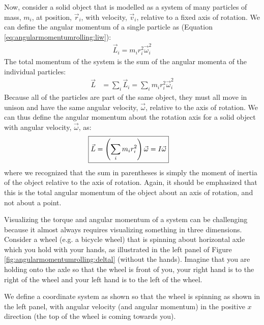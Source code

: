 Now, consider a solid object that is modelled as a system of many particles of mass, $m_i$, at position, $\vec r_i$, with velocity, $\vec v_i$, relative to a fixed axis of rotation. We can define the angular momentum of a single particle as (Equation \ref{eq:angularmomentumrolling:liw}):
\begin{align*}
\vec L_i = m_i r_i^2 \vec \omega_i^2
\end{align*}
The total momentum of the system is the sum of the angular momenta of the individual particles:
\begin{align*}
\vec L &= \sum_i\vec L_i = \sum_i  m_i r_i^2 \vec \omega_i^2
\end{align*}
Because all of the particles are part of the same object, they must all move in unison and have the same angular velocity, $\vec\omega$, relative to the axis of rotation. We can thus define the angular momentum about the rotation axis for a solid object with angular velocity, $\vec\omega$, as:
\begin{align}
\Aboxed{\vec L &= \left(\sum_i  m_i r_i^2\right) \vec \omega = I\vec\omega}
\end{align}
where we recognized that the sum in parentheses is simply the moment of inertia of the object relative to the axis of rotation. Again, it should be emphasized that this is the total angular momentum of the object about an axis of rotation, and not about a point. 

Visualizing the torque and angular momentum of a system can be challenging because it almost always requires visualizing something in three dimensions. Consider a wheel (e.g. a bicycle wheel) that is spinning about horizontal axle which you hold with your hands, as illustrated in the left panel of Figure \ref{fig:angularmomentumrolling:deltal} (without the hands). Imagine that you are holding onto the axle so that the wheel is front of you, your right hand is to the right of the wheel and your left hand is to the left of the wheel.

We define a coordinate system as shown so that the wheel is spinning as shown in the left panel, with angular velocity (and angular momentum) in the positive $x$ direction (the top of the wheel is coming towards you).

